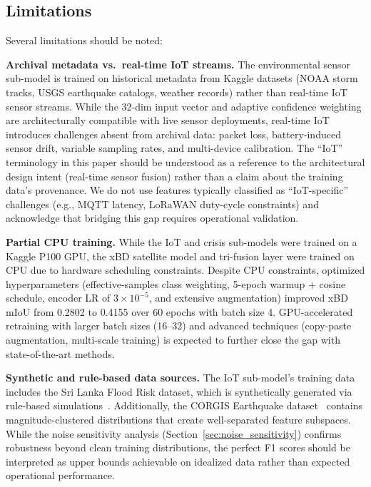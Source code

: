 \documentclass[journal]{IEEEtran}
\begin{document}
\subsection{Limitations}
\label{sec:limitations}

Several limitations should be noted:

\textbf{Archival metadata vs.\ real-time IoT streams.} The environmental sensor sub-model is trained on historical metadata from Kaggle datasets (NOAA storm tracks, USGS earthquake catalogs, weather records) rather than real-time IoT sensor streams. While the 32-dim input vector and adaptive confidence weighting are architecturally compatible with live sensor deployments, real-time IoT introduces challenges absent from archival data: packet loss, battery-induced sensor drift, variable sampling rates, and multi-device calibration. The ``IoT'' terminology in this paper should be understood as a reference to the architectural design intent (real-time sensor fusion) rather than a claim about the training data's provenance. We do not use features typically classified as ``IoT-specific'' challenges (e.g., MQTT latency, LoRaWAN duty-cycle constraints) and acknowledge that bridging this gap requires operational validation.

\textbf{Partial CPU training.} While the IoT and crisis sub-models were trained on a Kaggle P100 GPU, the xBD satellite model and tri-fusion layer were trained on CPU due to hardware scheduling constraints. Despite CPU constraints, optimized hyperparameters (effective-samples class weighting, 5-epoch warmup + cosine schedule, encoder LR of $3 \times 10^{-5}$, and extensive augmentation) improved xBD mIoU from 0.2802 to 0.4155 over 60 epochs with batch size 4. GPU-accelerated retraining with larger batch sizes (16--32) and advanced techniques (copy-paste augmentation, multi-scale training) is expected to further close the gap with state-of-the-art methods.

\textbf{Synthetic and rule-based data sources.} The IoT sub-model's training data includes the Sri Lanka Flood Risk dataset, which is synthetically generated via rule-based simulations~\cite{kaggle_srilanka_flood}. Additionally, the CORGIS Earthquake dataset~\cite{corgis_eq} contains magnitude-clustered distributions that create well-separated feature subspaces. While the noise sensitivity analysis (Section~\ref{sec:noise_sensitivity}) confirms robustness beyond clean training distributions, the perfect F1 scores should be interpreted as upper bounds achievable on idealized data rather than expected operational performance.
\end{document}
